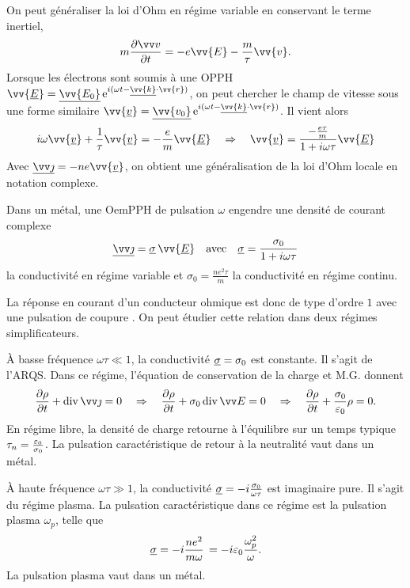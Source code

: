 \documentclass[12pt,fancy]{cours}
\begin{document}
On peut généraliser la loi d'Ohm en régime variable en conservant le terme inertiel,
\begin{equation}
 m\dr{\Vec{v}}{t}=-e\vv{E}-\frac{m}{\tau}\vv{v}.
 \end{equation}
 Lorsque les électrons sont soumis à une OPPH $\vv{\underline{E}}=\underline{\vv{E_0}}\,\e^{i(\omega t- \underline{\vv{k}}\cdot\vv{r})}$, on peut chercher le champ de vitesse sous une forme similaire $\vv{\underline{v}}=\underline{\vv{v_0}}\,\e^{i(\omega t- \underline{\vv{k}}\cdot\vv{r})}$.
  Il vient alors
 \begin{equation}
 i\omega\vv{\underline{v}}+\frac{1}{\tau}\vv{\underline{v}}=-\frac{e}{m}\vv{\underline{E}}\quad\Rightarrow\quad\vv{\underline{v}}=\frac{-\frac{e\tau}{m}}{1+i\omega \tau}\vv{\underline{E}}
 \end{equation}
Avec $\udl{\j}=-ne\vv{\underline{v}}$, on obtient une généralisation de la loi d'Ohm locale en notation complexe.
\begin{theorem}\label{form:}
  Dans un métal, une OemPPH de pulsation $\omega$ engendre une densité de courant complexe
  \begin{equation*}
  \udl{\j}=\underline{\sigma}\,\vv{\underline{E}}\quad\text{avec}\quad\underline{\sigma}=\frac{\sigma_0}{1+i\omega \tau}
\end{equation*}
la conductivité en régime variable et $\sigma_0 = \frac{ne^2\tau}{m}$ la conductivité en régime continu.
\end{theorem}
 La réponse en courant d'un conducteur ohmique est donc de type  d'ordre $1$ avec une pulsation de coupure . On peut étudier cette relation dans deux régimes simplificateurs.
 \begin{liste}
  \item À basse fréquence $\omega \tau \ll 1$, la conductivité $\underline{\sigma} = \sigma_0$ est constante. Il s’agit de l’ARQS. Dans ce régime, l'équation de conservation de la charge et M.G. donnent 
  \begin{equation}
    \dr{\rho}{t} + \dive{\j} = 0 \Rar  \dr{\rho}{t} + \sigma_0\, \dive{\E} = 0 \Rar  \dr{\rho}{t} + \frac{\sigma_0}{\epz} \rho = 0.
  \end{equation}
  En régime libre, la densité de charge retourne à l'équilibre sur un temps typique $\tau_n = \frac{\varepsilon_0}{\sigma_0}$. La pulsation caractéristique de retour à la neutralité vaut  dans un métal.
  \item À haute fréquence $\omega \tau \gg 1$, la conductivité $\underline{\sigma} = -i\frac{\sigma_0}{\omega \tau}$ est imaginaire pure. Il s’agit du régime plasma. La pulsation caractéristique dans ce régime est la pulsation plasma $\omega_p$, telle que  
  \begin{equation}
  \underline{\sigma} = - i \frac{ne^2}{m\omega}\, = - i \varepsilon_0 \frac{\omega_p^2}{\omega}.
  \end{equation}
  La pulsation plasma vaut  dans un métal.
\end{liste}
 
\end{document}
